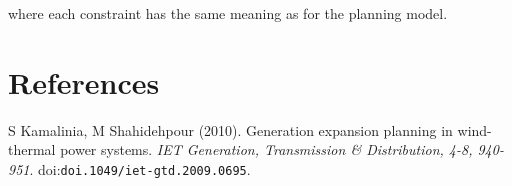 \documentclass[preprint]{elsarticle}
\begin{document}
\noindent where each constraint has the same meaning as for the planning model.



\section{References}
\label{sec:references}

\noindent S Kamalinia, M Shahidehpour (2010). Generation expansion planning in wind-thermal power systems. \textit{IET Generation, Transmission \& Distribution, 4-8, 940-951}. doi:\texttt{doi.1049/iet-gtd.2009.0695}.
\end{document}
